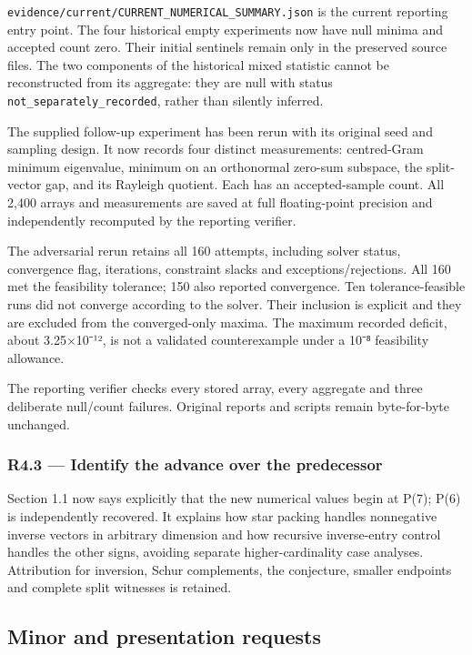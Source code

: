 \documentclass[
  10pt,
]{article}
\begin{document}
\texttt{evidence/current/CURRENT\_NUMERICAL\_SUMMARY.json} is the
current reporting entry point. The four historical empty experiments now
have null minima and accepted count zero. Their initial sentinels remain
only in the preserved source files. The two components of the historical
mixed statistic cannot be reconstructed from its aggregate: they are
null with status \texttt{not\_separately\_recorded}, rather than
silently inferred.

The supplied follow-up experiment has been rerun with its original seed
and sampling design. It now records four distinct measurements:
centred-Gram minimum eigenvalue, minimum on an orthonormal zero-sum
subspace, the split-vector gap, and its Rayleigh quotient. Each has an
accepted-sample count. All 2,400 arrays and measurements are saved at
full floating-point precision and independently recomputed by the
reporting verifier.

The adversarial rerun retains all 160 attempts, including solver status,
convergence flag, iterations, constraint slacks and
exceptions/rejections. All 160 met the feasibility tolerance; 150 also
reported convergence. Ten tolerance-feasible runs did not converge
according to the solver. Their inclusion is explicit and they are
excluded from the converged-only maxima. The maximum recorded deficit,
about 3.25×10⁻¹², is not a validated counterexample under a 10⁻⁸
feasibility allowance.

The reporting verifier checks every stored array, every aggregate and
three deliberate null/count failures. Original reports and scripts
remain byte-for-byte unchanged.

\subsubsection{R4.3 --- Identify the advance over the
predecessor}\label{r4.3-identify-the-advance-over-the-predecessor}

Section 1.1 now says explicitly that the new numerical values begin at
P(7); P(6) is independently recovered. It explains how star packing
handles nonnegative inverse vectors in arbitrary dimension and how
recursive inverse-entry control handles the other signs, avoiding
separate higher-cardinality case analyses. Attribution for inversion,
Schur complements, the conjecture, smaller endpoints and complete split
witnesses is retained.

\subsection{Minor and presentation
requests}\label{minor-and-presentation-requests}
\end{document}
